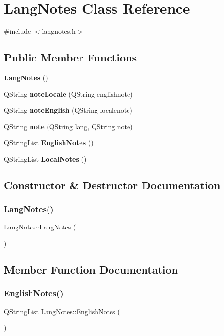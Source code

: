 \section{Lang\+Notes Class Reference}
\label{class_lang_notes}


{\ttfamily \#include $<$langnotes.\+h$>$}

\subsection*{Public Member Functions}
\begin{DoxyCompactItemize}
\item 
\textbf{ Lang\+Notes} ()
\item 
Q\+String \textbf{ note\+Locale} (Q\+String englishnote)
\item 
Q\+String \textbf{ note\+English} (Q\+String localenote)
\item 
Q\+String \textbf{ note} (Q\+String lang, Q\+String note)
\item 
Q\+String\+List \textbf{ English\+Notes} ()
\item 
Q\+String\+List \textbf{ Local\+Notes} ()
\end{DoxyCompactItemize}


\subsection{Constructor \& Destructor Documentation}
\mbox{\label{class_lang_notes_a90d892321f06ccd3b6e1f5c4acaf6c73}} 
\subsubsection{Lang\+Notes()}
{\footnotesize\ttfamily Lang\+Notes\+::\+Lang\+Notes (\begin{DoxyParamCaption}{ }\end{DoxyParamCaption})}



\subsection{Member Function Documentation}
\mbox{\label{class_lang_notes_a12edadd856b0a01588e2a61a05409a96}} 
\subsubsection{English\+Notes()}
{\footnotesize\ttfamily Q\+String\+List Lang\+Notes\+::\+English\+Notes (\begin{DoxyParamCaption}{ }\end{DoxyParamCaption})}

